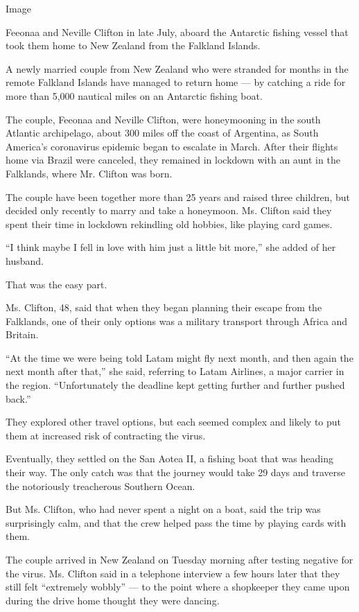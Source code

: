 Image

Feeonaa and Neville Clifton in late July, aboard the Antarctic fishing
vessel that took them home to New Zealand from the Falkland Islands.

A newly married couple from New Zealand who were stranded for months in
the remote Falkland Islands have managed to return home --- by catching
a ride for more than 5,000 nautical miles on an Antarctic fishing boat.

The couple, Feeonaa and Neville Clifton, were honeymooning in the south
Atlantic archipelago, about 300 miles off the coast of Argentina, as
South America's coronavirus epidemic began to escalate in March. After
their flights home via Brazil were canceled, they remained in lockdown
with an aunt in the Falklands, where Mr. Clifton was born.

The couple have been together more than 25 years and raised three
children, but decided only recently to marry and take a honeymoon. Ms.
Clifton said they spent their time in lockdown rekindling old hobbies,
like playing card games.

``I think maybe I fell in love with him just a little bit more,'' she
added of her husband.

That was the easy part.

Ms. Clifton, 48, said that when they began planning their escape from
the Falklands, one of their only options was a military transport
through Africa and Britain.

``At the time we were being told Latam might fly next month, and then
again the next month after that,'' she said, referring to Latam
Airlines, a major carrier in the region. ``Unfortunately the deadline
kept getting further and further pushed back.''

They explored other travel options, but each seemed complex and likely
to put them at increased risk of contracting the virus.

Eventually, they settled on the San Aotea II, a fishing boat that was
heading their way. The only catch was that the journey would take 29
days and traverse the notoriously treacherous Southern Ocean.

But Ms. Clifton, who had never spent a night on a boat, said the trip
was surprisingly calm, and that the crew helped pass the time by playing
cards with them.

The couple arrived in New Zealand on Tuesday morning after testing
negative for the virus. Ms. Clifton said in a telephone interview a few
hours later that they still felt ``extremely wobbly'' --- to the point
where a shopkeeper they came upon during the drive home thought they
were dancing.

